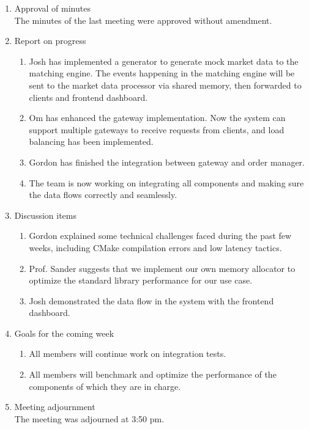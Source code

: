 \documentclass[12pt,a4paper]{article}
\begin{document}
\begin{enumerate}
\item Approval of minutes\\
The minutes of the last meeting were approved without amendment.\\
\item Report on progress
\begin{enumerate}
\item Josh has implemented a generator to generate mock market data to the matching engine. The events happening in the matching engine will be sent to the market data processor via shared memory, then forwarded to clients and frontend dashboard.\\
\item Om has enhanced the gateway implementation. Now the system can support multiple gateways to receive requests from clients, and load balancing has been implemented.\\
\item Gordon has finished the integration between gateway and order manager.\\
\item The team is now working on integrating all components and making sure the data flows correctly and seamlessly.\\
\end{enumerate}
\item Discussion items
\begin{enumerate}
\item Gordon explained some technical challenges faced during the past few weeks, including CMake compilation errors and low latency tactics.\\
\item Prof. Sander suggests that we implement our own memory allocator to optimize the standard library performance for our use case.\\
\item Josh demonstrated the data flow in the system with the frontend dashboard.\\
\end{enumerate}
\item Goals for the coming week
\begin{enumerate}
\item All members will continue work on integration tests.\\
\item All members will benchmark and optimize the performance of the components of which they are in charge.\\
\end{enumerate}
\item Meeting adjournment\\
The meeting was adjourned at 3:50 pm.
\end{enumerate}
\end{document}
